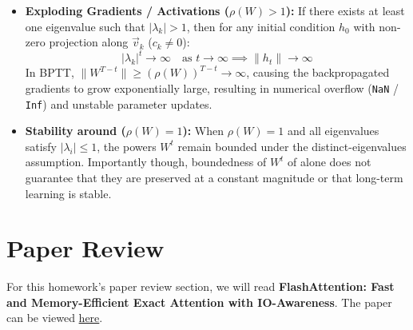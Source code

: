 \documentclass[11pt,english]{article}
\begin{document}
\begin{enumerate}[resume]
\begin{itemize}
    \item \textbf{Exploding Gradients / Activations ($\rho(W) > 1$):}
    If there exists at least one eigenvalue such that $|\lambda_k| > 1$, then for any initial condition $h_0$ with non-zero projection along $\vec{v}_k$ ($c_k \neq 0$):
    \[
    |\lambda_k|^t \to \infty \quad \text{as } t \to \infty \implies \|h_t\| \to \infty
    \]
    In BPTT, $\|W^{T-t}\| \ge (\rho(W))^{T-t} \to \infty$, causing the backpropagated gradients to grow exponentially large, resulting in numerical overflow (\texttt{NaN} / \texttt{Inf}) and unstable parameter updates.

    \item \textbf{Stability around ($\rho(W) = 1$):}
    When \(\rho(W)=1\) and all eigenvalues satisfy \(|\lambda_i|\leq 1\), the powers \(W^t\) remain bounded under the distinct-eigenvalues assumption. Importantly though, boundedness of \(W^t\) of  alone does not guarantee that they are preserved at a constant magnitude or that long-term learning is stable.
\end{itemize}

\end{enumerate}

\newpage
\section{Paper Review}

For this homework's paper review section, we will read \textbf{FlashAttention: Fast and Memory-Efficient Exact Attention with IO-Awareness}. The paper can be viewed \href{https://arxiv.org/abs/2205.14135}
{here}.
\end{document}
